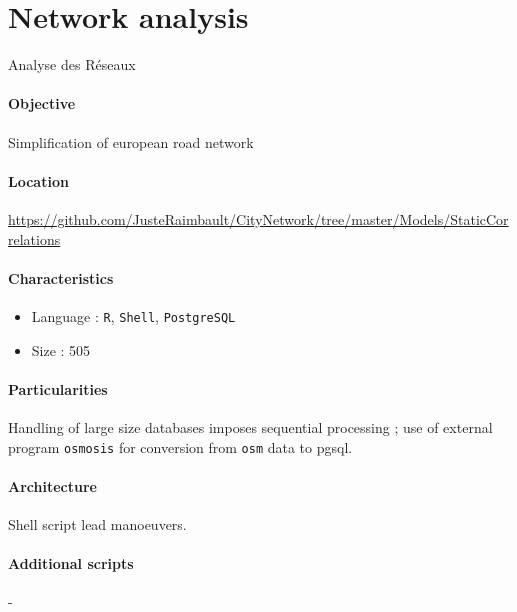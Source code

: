 

\section{Network analysis}{Analyse des Réseaux}

\paragraph{Objective}

Simplification of european road network

\paragraph{Location}

\url{https://github.com/JusteRaimbault/CityNetwork/tree/master/Models/StaticCorrelations}

\paragraph{Characteristics}

\begin{itemize}
\item Language : \texttt{R}, \texttt{Shell}, \texttt{PostgreSQL}
\item Size : 505
\end{itemize}


\paragraph{Particularities}

Handling of large size databases imposes sequential processing ; use of external program \texttt{osmosis} for conversion from \texttt{osm} data to pgsql.

\paragraph{Architecture}

Shell script lead manoeuvers.

\paragraph{Additional scripts}

-



